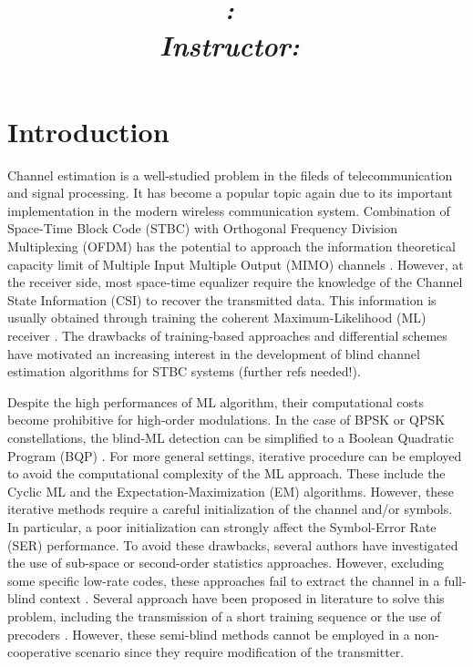 \documentclass[letterpaper,10pt]{article}
\title{
    \vspace{2in}
    \textmd{\textbf{\projectname}}\\
    \normalsize\vspace{0.3in}\large{\textit{\hmwkClass:\ \hmwkTitle}}\\
    \vspace{0.1in}\large{\textit{Instructor:\ \hmwkClassInstructor}}
    \vspace{3in}
}
\author{\textbf{\hmwkAuthorName}}
\date{}
\begin{document}
\maketitle

\pagebreak

\section{Introduction}

Channel estimation is a well-studied problem in the fileds of telecommunication and signal processing. It has become a popular topic again due to its important implementation in the modern wireless communication system. Combination of Space-Time Block Code (STBC) with Orthogonal Frequency Division Multiplexing (OFDM) has the potential to approach the information theoretical capacity limit of Multiple Input Multiple Output (MIMO) channels \cite{Ganesan:2001}. However, at the receiver side, most space-time equalizer require the knowledge of the Channel State Information (CSI) to recover the transmitted data. This information is usually obtained through training the coherent Maximum-Likelihood (ML) receiver \cite{Larsson:2003}. The drawbacks of training-based approaches and differential schemes have motivated an increasing interest in the development of blind channel estimation algorithms for STBC systems (further refs needed!). 

Despite the high performances of ML algorithm, their computational costs become prohibitive for high-order modulations. In the case of BPSK or QPSK constellations, the blind-ML detection can be simplified to a Boolean Quadratic Program (BQP) \cite{Ma:2006}. For more general settings, iterative procedure can be employed to avoid the computational complexity of the ML approach. These include the Cyclic ML \cite{Larsson:2003} and the Expectation-Maximization (EM) \cite{Li:2001} algorithms. However, these iterative methods require a careful initialization of the channel and/or symbols. In particular, a poor initialization can strongly affect the Symbol-Error Rate (SER) performance. To avoid these drawbacks, several authors have investigated the use of sub-space \cite{Ammar:2007} or second-order statistics \cite{Shahbazpanahi:2005, Via:2008} approaches. However, excluding some specific low-rate codes, these approaches fail to extract the channel in a full-blind context \cite{Ammar:2007, Shahbazpanahi:2005, Via:2008}. Several approach have been proposed in literature to solve this problem, including the transmission of a short training sequence \cite{Ammar:2007} or the use of precoders \cite{Via:2008}. However, these semi-blind methods cannot be employed in a non-cooperative scenario since they require modification of the transmitter.
\end{document}
